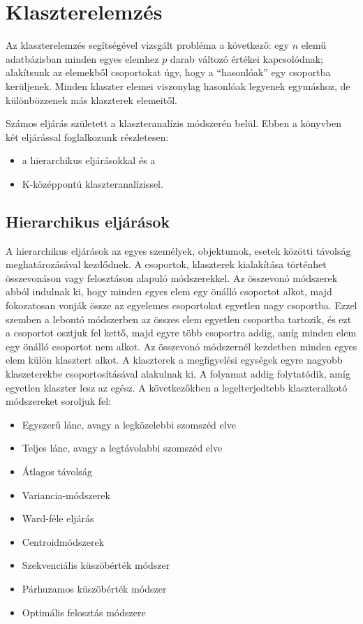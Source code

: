 \documentclass[
  letterpaper,
]{krantz}
\providecommand{\tightlist}{%
  \setlength{\itemsep}{0pt}\setlength{\parskip}{0pt}}\usepackage{longtable,booktabs,array}
\begin{document}
\hypertarget{sec-klaszterelemzes}{%
\chapter{Klaszterelemzés}\label{sec-klaszterelemzes}}

Az klaszterelemzés segítségével vizsgált probléma a következő: egy \(n\)
elemű adatbázisban minden egyes elemhez \(p\) darab változó értékei
kapcsolódnak; alakítsunk az elemekből csoportokat úgy, hogy a
``hasonlóak'' egy csoportba kerüljenek. Minden klaszter elemei
viszonylag hasonlóak legyenek egymáshoz, de különbözzenek más klaszterek
elemeitől.

Számos eljárás született a klaszteranalízis módszerén belül. Ebben a
könyvben két eljárással foglalkozunk részletesen:

\begin{itemize}
\tightlist
\item
  a hierarchikus eljárásokkal és a
\item
  K-középpontú klaszteranalízissel.
\end{itemize}

\hypertarget{hierarchikus-eljuxe1ruxe1sok}{%
\section{Hierarchikus eljárások}\label{hierarchikus-eljuxe1ruxe1sok}}

A hierarchikus eljárások az egyes személyek, objektumok, esetek közötti
távolság meghatározásával kezdődnek. A csoportok, klaszterek kialakítása
történhet összevonáson vagy felosztáson alapuló módszerekkel. Az
összevonó módszerek abból indulnak ki, hogy minden egyes elem egy önálló
csoportot alkot, majd fokozatosan vonják össze az egyelemes csoportokat
egyetlen nagy csoportba. Ezzel szemben a lebontó módszerben az összes
elem egyetlen csoportba tartozik, és ezt a csoportot osztjuk fel kettő,
majd egyre több csoportra addig, amíg minden elem egy önálló csoportot
nem alkot. Az összevonó módszernél kezdetben minden egyes elem külön
klasztert alkot. A klaszterek a megfigyelési egységek egyre nagyobb
klaszeterekbe csoportosításával alakulnak ki. A folyamat addig
folytatódik, amíg egyetlen klaszter lesz az egész. A következőkben a
legelterjedtebb klaszteralkotó módszereket soroljuk fel:

\begin{itemize}
\tightlist
\item
  Egyszerű lánc, avagy a legközelebbi szomszéd elve
\item
  Teljes lánc, avagy a legtávolabbi szomszéd elve
\item
  Átlagos távolság
\item
  Variancia-módszerek
\item
  Ward-féle eljárás
\item
  Centroidmódszerek
\item
  Szekvenciális küszöbérték módszer
\item
  Párhuzamos küszöbérték módszer
\item
  Optimális felosztás módszere
\end{itemize}
\end{document}
